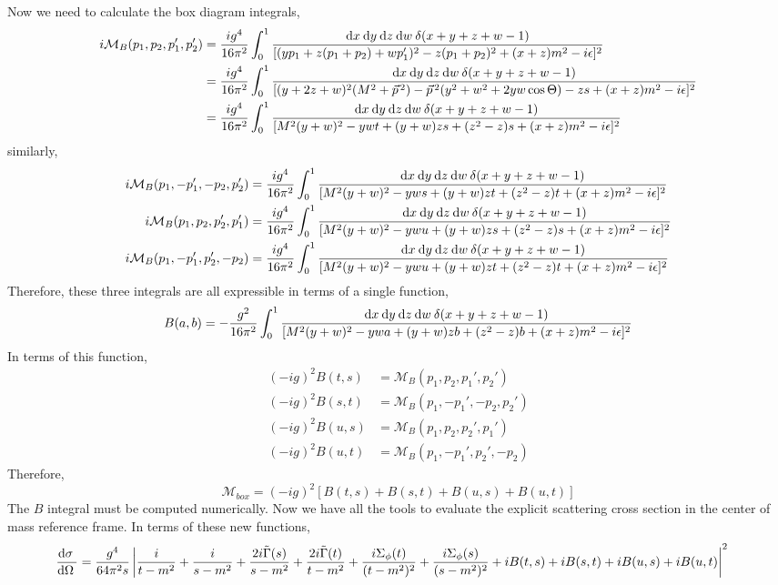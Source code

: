 \documentclass[12pt]{extarticle}
\begin{document}
Now we need to calculate the box diagram integrals,
\begin{align*}  
i\mathcal{M}_B(p_1, p_2, p_1', p_2') &= \frac{ig^4}{16 \pi^2} \int_{0}^{1} \frac{\mathrm{d}x \: \mathrm{d}y \: \mathrm{d}z \: \mathrm{d}w \: \delta(x + y + z + w - 1) }{[(y p_1 + z (p_1 + p_2) + w p_1' )^2 - z (p_1 + p_2)^2 + (x + z)m^2 - i \epsilon]^2} 
\\
& = \frac{ig^4}{16 \pi^2} \int_{0}^{1} \frac{\mathrm{d}x \: \mathrm{d}y \: \mathrm{d}z \: \mathrm{d}w \: \delta(x + y + z + w - 1) }{[(y + 2 z + w)^2 (M^2 + \vec{p}^{\, 2}) - \vec{p}^{\, 2}(y^2 + w^2 + 2 yw \cos{\Theta}) - z s + (x + z)m^2 - i \epsilon]^2} 
\\
& = \frac{ig^4}{16 \pi^2} \int_{0}^{1} \frac{\mathrm{d}x \: \mathrm{d}y \: \mathrm{d}z \: \mathrm{d}w \: \delta(x + y + z + w - 1) }{[M^2 (y + w)^2 - yw t + (y + w)z s + (z^2 - z)s + (x + z)m^2 - i \epsilon]^2} 
\end{align*}
similarly,
\begin{align*}  
i\mathcal{M}_B(p_1, -p_1', -p_2, p_2') & = \frac{ig^4}{16 \pi^2} \int_{0}^{1} \frac{\mathrm{d}x \: \mathrm{d}y \: \mathrm{d}z \: \mathrm{d}w \: \delta(x + y + z + w - 1) }{[M^2 (y + w)^2 - yw s + (y + w)z t + (z^2 - z) t + (x + z)m^2 - i \epsilon]^2} 
\\
i\mathcal{M}_B(p_1, p_2, p_2', p_1') & = \frac{ig^4}{16 \pi^2} \int_{0}^{1} \frac{\mathrm{d}x \: \mathrm{d}y \: \mathrm{d}z \: \mathrm{d}w \: \delta(x + y + z + w - 1) }{[M^2 (y + w)^2 - yw u + (y + w)z s + (z^2 - z) s + (x + z)m^2 - i \epsilon]^2} 
\\
i\mathcal{M}_B(p_1, -p_1', p_2', -p_2) & = \frac{ig^4}{16 \pi^2} \int_{0}^{1} \frac{\mathrm{d}x \: \mathrm{d}y \: \mathrm{d}z \: \mathrm{d}w \: \delta(x + y + z + w - 1) }{[M^2 (y + w)^2 - yw u + (y + w)z t + (z^2 - z) t + (x + z)m^2 - i \epsilon]^2} 
\end{align*}
Therefore, these three integrals are all expressible in terms of a single function,
\[ B(a,b) = -\frac{g^2}{16 \pi^2} \int_{0}^{1} \frac{\mathrm{d}x \: \mathrm{d}y \: \mathrm{d}z \: \mathrm{d}w \: \delta(x + y + z + w - 1) }{[M^2 (y + w)^2 - yw a + (y + w)z b + (z^2 - z) b + (x + z)m^2 - i \epsilon]^2} \]
In terms of this function,
\begin{align*}
(-ig)^2 B(t, s) &= \mathcal{M}_B(p_1, p_2, p_1', p_2') \\
(-ig)^2 B(s, t) &= \mathcal{M}_B(p_1, -p_1', -p_2, p_2') \\
(-ig)^2 B(u, s) &= \mathcal{M}_B(p_1, p_2, p_2', p_1') \\
(-ig)^2 B(u, t) &= \mathcal{M}_B(p_1, -p_1', p_2', -p_2) 
\end{align*}
Therefore,
\[\mathcal{M}_{box} = (-ig)^2[B(t, s) + B(s, t) + B(u, s) + B(u,t)]\]
The $B$ integral must be computed numerically.
Now we have all the tools to evaluate the explicit scattering cross section in the center of mass reference frame. In terms of these new functions,
\begin{align*}
\frac{\mathrm{d}\sigma \:}{\mathrm{d}\Omega \:} 
&= \frac{g^4}{64 \pi^2 s} \left| \frac{i}{t - m^2} + \frac{i}{s - m^2} + \frac{2i \tilde{\Gamma}(s)}{s - m^2} + \frac{2i \tilde{\Gamma}(t)}{t - m^2} + \frac{i \Sigma_\phi(t)}{(t - m^2)^2} + \frac{i \Sigma_\phi(s)}{(s - m^2)^2} + i B(t, s) + i B(s, t) + i B(u, s) + i B(u,t)  \right|^2 
\end{align*}
\end{document}
